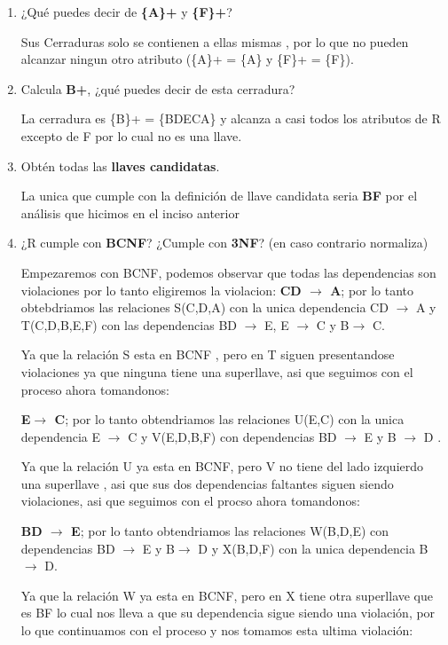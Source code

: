 \documentclass[a4paper, 12pt]{report}
\begin{document}
\begin{enumerate}
\begin{enumerate}
	\item ¿Qué puedes decir de \textbf{\{A\}+} y \textbf{\{F\}+}? 
	
Sus Cerraduras solo se contienen a ellas mismas , por lo que no pueden alcanzar ningun otro atributo (\{A\}+ = \{A\} y \{F\}+ = \{F\}).

	\item Calcula \textbf{{B}+}, ¿qué puedes decir de esta cerradura? 
	
	La cerradura es \{B\}+ = \{BDECA\} y alcanza a casi todos los atributos de R excepto de F por lo cual no es una llave. 
	
	\item Obtén todas las \textbf{llaves candidatas}. 
	
	La unica que cumple con la definición de llave candidata seria \textbf{BF} por el análisis que hicimos en el inciso anterior
	
	\item ¿R cumple con \textbf{BCNF}? ¿Cumple con \textbf{3NF}? (en caso contrario normaliza)
	
	Empezaremos con BCNF, podemos observar que todas las dependencias son violaciones por lo tanto eligiremos la violacion:  \textbf{CD $\rightarrow$ A};
	por lo tanto obtebdriamos las relaciones S(C,D,A) con la unica dependencia CD $\rightarrow$ A y T(C,D,B,E,F) con las dependencias BD $\rightarrow$ E, E $\rightarrow$ C y B$\rightarrow$ C.
	
	Ya que la relación S esta en BCNF , pero en T siguen presentandose violaciones ya que ninguna tiene una superllave, asi que seguimos con el proceso ahora tomandonos:
	
	\textbf{E$\rightarrow$ C};
	por lo tanto obtendriamos las relaciones U(E,C) con la unica dependencia E $\rightarrow	$ C y V(E,D,B,F) con dependencias BD $\rightarrow$ E y B $\rightarrow$ D .
	
	Ya que la relación U ya esta en BCNF, pero V no tiene del lado izquierdo una superllave , asi que sus dos dependencias faltantes siguen siendo violaciones, asi que seguimos con el procso ahora tomandonos:
	
	\textbf{BD $\rightarrow$ E};	
	por lo tanto obtendriamos las relaciones W(B,D,E) con dependencias BD $\rightarrow$ E y B$\rightarrow$ D y X(B,D,F) con la unica dependencia B$\rightarrow$ D.
	
	Ya que la relación W ya esta en BCNF, pero en X tiene otra superllave que es BF lo cual nos lleva a que su dependencia sigue siendo una violación, por lo que continuamos con el proceso y nos tomamos esta ultima violación:
	

\end{enumerate}
\end{enumerate}
\end{document}
